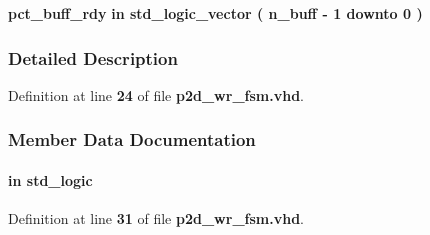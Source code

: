 \begin{DoxyCompactItemize}
\item 
{\bf pct\+\_\+buff\+\_\+rdy}  {\bfseries {\bfseries \textcolor{keywordflow}{in}\textcolor{vhdlchar}{ }}} {\bfseries \textcolor{comment}{std\+\_\+logic\+\_\+vector}\textcolor{vhdlchar}{ }\textcolor{vhdlchar}{(}\textcolor{vhdlchar}{ }\textcolor{vhdlchar}{ }\textcolor{vhdlchar}{ }\textcolor{vhdlchar}{ }{\bfseries {\bf n\+\_\+buff}} \textcolor{vhdlchar}{-\/}\textcolor{vhdlchar}{ } \textcolor{vhdldigit}{1} \textcolor{vhdlchar}{ }\textcolor{keywordflow}{downto}\textcolor{vhdlchar}{ }\textcolor{vhdlchar}{ } \textcolor{vhdldigit}{0} \textcolor{vhdlchar}{ }\textcolor{vhdlchar}{)}\textcolor{vhdlchar}{ }} 
\end{DoxyCompactItemize}


\subsubsection{Detailed Description}


Definition at line {\bf 24} of file {\bf p2d\+\_\+wr\+\_\+fsm.\+vhd}.



\subsubsection{Member Data Documentation}
\paragraph[{clk}]{ {\bfseries \textcolor{keywordflow}{in}\textcolor{vhdlchar}{ }} {\bfseries \textcolor{comment}{std\+\_\+logic}\textcolor{vhdlchar}{ }} \hspace{0.3cm}{\ttfamily [Port]}}\label{classp2d__wr__fsm_a4a4609c199d30b3adebbeb3a01276ec5}


Definition at line {\bf 31} of file {\bf p2d\+\_\+wr\+\_\+fsm.\+vhd}.

\paragraph[{ieee}]{\hspace{0.3cm}{\ttfamily [Library]}}\label{classp2d__wr__fsm_a0a6af6eef40212dbaf130d57ce711256}


